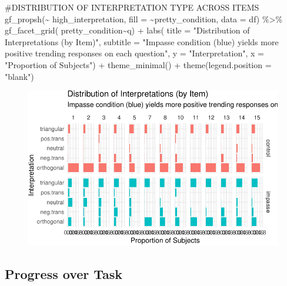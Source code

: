 \documentclass[
  letterpaper,
  DIV=11,
  numbers=noendperiod]{scrreprt}
\newenvironment{Shaded}{\begin{snugshade}}{\end{snugshade}}
\newcommand{\AttributeTok}[1]{\textcolor[rgb]{0.40,0.45,0.13}{#1}}
\newcommand{\CommentTok}[1]{\textcolor[rgb]{0.37,0.37,0.37}{#1}}
\newcommand{\FunctionTok}[1]{\textcolor[rgb]{0.28,0.35,0.67}{#1}}
\newcommand{\NormalTok}[1]{\textcolor[rgb]{0.00,0.23,0.31}{#1}}
\newcommand{\SpecialCharTok}[1]{\textcolor[rgb]{0.37,0.37,0.37}{#1}}
\newcommand{\StringTok}[1]{\textcolor[rgb]{0.13,0.47,0.30}{#1}}
\begin{document}
\begin{Shaded}
\begin{Highlighting}[]
\CommentTok{\#DISTRIBUTION OF INTERPRETATION TYPE ACROSS ITEMS}
\FunctionTok{gf\_propsh}\NormalTok{(}\SpecialCharTok{\textasciitilde{}}\NormalTok{ high\_interpretation, }\AttributeTok{fill =} \SpecialCharTok{\textasciitilde{}}\NormalTok{pretty\_condition, }\AttributeTok{data =}\NormalTok{ df) }\SpecialCharTok{\%\textgreater{}\%} 
  \FunctionTok{gf\_facet\_grid}\NormalTok{( pretty\_condition}\SpecialCharTok{\textasciitilde{}}\NormalTok{q) }\SpecialCharTok{+} 
  \FunctionTok{labs}\NormalTok{( }\AttributeTok{title =} \StringTok{"Distribution of Interpretations (by Item)"}\NormalTok{,}
        \AttributeTok{subtitle =} \StringTok{"Impasse condition (blue) yields more positive trending responses on each question"}\NormalTok{,}
        \AttributeTok{y =} \StringTok{"Interpretation"}\NormalTok{, }\AttributeTok{x =} \StringTok{"Proportion of Subjects"}\NormalTok{) }\SpecialCharTok{+} \FunctionTok{theme\_minimal}\NormalTok{() }\SpecialCharTok{+} \FunctionTok{theme}\NormalTok{(}\AttributeTok{legend.position =} \StringTok{"blank"}\NormalTok{)}
\end{Highlighting}
\end{Shaded}

\begin{figure}[H]

{\centering \includegraphics{analysis/SGC3A/2_sgc3A_scoring_files/figure-pdf/DISTR-INTERPRETATIONS-3.pdf}

}

\end{figure}

\hypertarget{progress-over-task}{%
\subsection{Progress over Task}\label{progress-over-task}}
\end{document}
